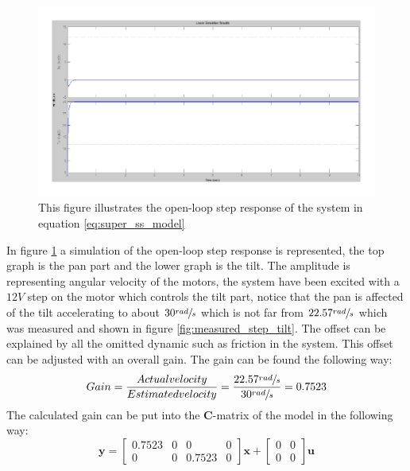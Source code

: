 \begin{figure}[htb]
	\begin{center}
	\includegraphics[scale=1,trim=0 0 0 0]{graphics/GoodSim.pdf} %
	\caption{This figure illustrates the open-loop step response of the system in equation \ref{eq:super_ss_model}}
	\label{fig:good_step}			%
	\end{center}
\end{figure}
In figure \ref{fig:good_step} a simulation of the open-loop step response is represented, the top graph is the pan part and the lower graph is the tilt. The amplitude is representing angular velocity of the motors, the system have been excited with a $12V$ step on the motor which controls the tilt part, notice that the pan is affected of the tilt accelerating to about $30\sfrac{rad}{s}$ which is not far from $22.57\sfrac{rad}{s}$ which was measured and shown in figure \ref{fig:measured_step_tilt}. The offset can be explained by all the omitted dynamic such as friction in the system. This offset can be adjusted with an overall gain. The gain can be found the following way:
\begin{equation}
	Gain = \frac{Actual velocity}{Estimated velocity} = \frac{22.57\sfrac{rad}{s}}{30\sfrac{rad}{s}} = 0.7523\label{eq:gain_constant}
\end{equation}
The calculated gain can be put into the \textbf{C}-matrix of the model in the following way:
\begin{equation}
 \textbf{y} =
 \begin{bmatrix}
   0.7523 & 0 & 0 & 0\\
   0 & 0 & 0.7523 & 0
 \end{bmatrix}
 \textbf{x} +
 \begin{bmatrix}
   0 & 0\\
   0 & 0
 \end{bmatrix}
 \textbf{u}\label{eq:output_ss_model}
\end{equation}
